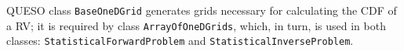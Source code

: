 QUESO class \verb+BaseOneDGrid+ generates grids necessary for calculating the CDF of a RV; it is required by class \verb+ArrayOfOneDGrids+, which, in turn, is used in both classes: \linebreak \verb+StatisticalForwardProblem+ and \verb+StatisticalInverseProblem+.

%
%
%



